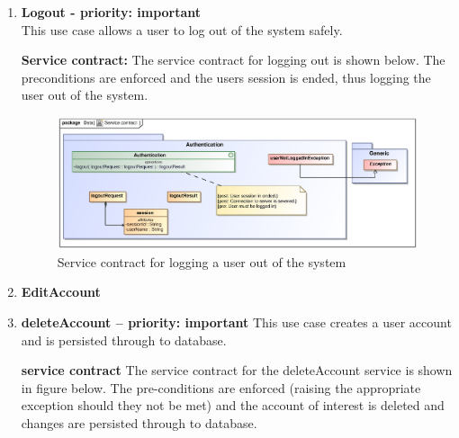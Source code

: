 \documentclass[12pt]{article}
\begin{document}
\begin{enumerate}
\item \textbf{Logout - priority: important} \\
This use case allows a user to log out of the system safely.

\par{\textbf{Service contract:} The service contract for logging out is shown below. The preconditions are enforced and the users session is ended, thus logging the user out of the system.}
\begin{figure}[h]

\includegraphics[scale=.9]{epsImages/Authentication/logoutServiceContract.eps}
\caption{Service contract for logging a user out of the system}
\end{figure}
\item \textbf{EditAccount}
\item \textbf{deleteAccount  – priority: important} 
This use case creates  a user account and is persisted through to database.

\par{\textbf{service contract} The service contract for the deleteAccount  service is shown in figure below. The pre-conditions are enforced (raising the appropriate exception should they not be met) and the account of interest is deleted and changes are persisted through to database.}


\end{enumerate}
\end{document}
